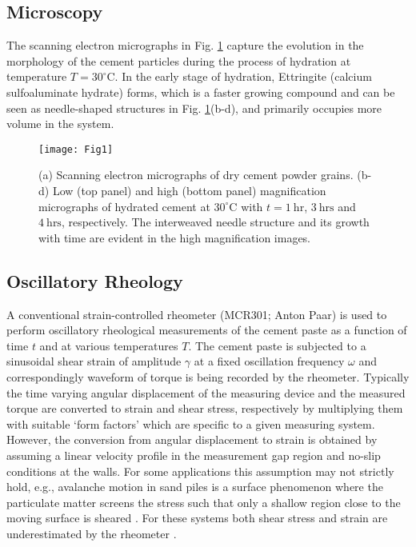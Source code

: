 \documentclass[final,5p,twocolumn]{elsarticle}
\begin{document}
{\subsection{Microscopy}
The scanning electron micrographs in Fig. \ref{fig1} capture the evolution in the morphology of the cement particles during the process of hydration at temperature $T=30^{\circ}\mbox{C}$. 
In the early stage of hydration, Ettringite (calcium sulfoaluminate hydrate) forms, which is a faster growing compound and can be seen as needle-shaped structures in Fig. \ref{fig1}(b-d), and primarily occupies more volume in the system.
\begin{figure}[t!]	
\centering
\texttt{[image: Fig1]}
\caption{(a) Scanning electron micrographs of dry cement  powder grains. (b-d) Low  (top panel) and high  (bottom panel) magnification micrographs of hydrated cement at $30^{\circ}\mbox{C}$ with $t=1~\mbox{hr}$, $3~\mbox{hrs}$ and  $4~\mbox{hrs}$, respectively. The interweaved needle structure and its growth with time are evident in the high magnification images.}
\label{fig1}
\end{figure}
\subsection{Oscillatory Rheology} 
A conventional strain-controlled rheometer (MCR301;  Anton Paar) is used to perform oscillatory rheological measurements of the cement paste as a function of time $t$ and at various temperatures $T$. The cement paste is subjected to a sinusoidal shear strain of amplitude $\gamma$  at a fixed oscillation frequency $\omega$ and correspondingly waveform of torque  is being recorded by the rheometer. Typically the time varying angular displacement  of the measuring device and the measured torque are converted  to strain  and shear stress, respectively by multiplying them with suitable `form factors' which are specific to a given measuring system. However, the conversion from angular displacement to strain is obtained by assuming a linear velocity profile in the measurement gap region and no-slip conditions at the walls. For some applications this  assumption may not  strictly hold, e.g., avalanche motion in sand piles is  a surface phenomenon where   the  particulate matter  screens the stress  such that only a shallow  region  close to the moving surface is sheared \cite{atman_stress_2005}. For these systems both  shear stress and  strain are underestimated by the rheometer \cite{hyun_review_2011}. 

}
\end{document}
